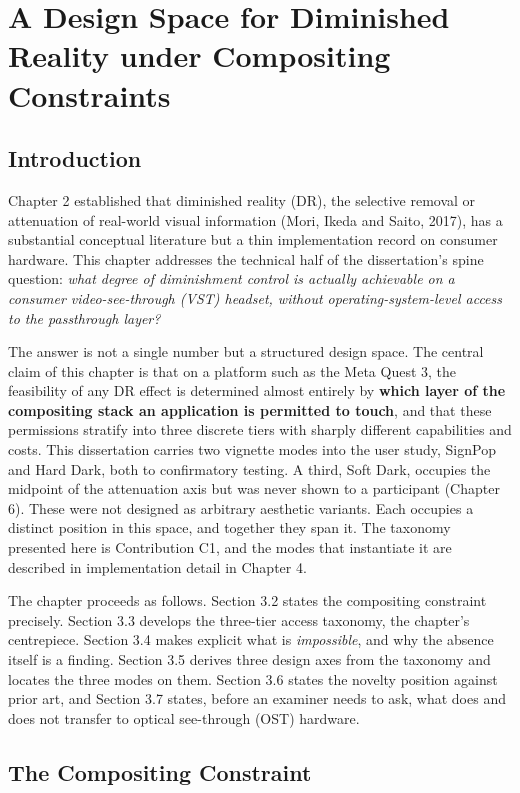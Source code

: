 \chapter{A Design Space for Diminished Reality under Compositing Constraints}

\section{Introduction}

Chapter 2 established that diminished reality (DR), the selective removal or attenuation of
real-world visual information (Mori, Ikeda and Saito, 2017), has a substantial conceptual literature
but a thin implementation record on consumer hardware. This chapter addresses the technical half of the dissertation's spine
question: \textit{what degree of diminishment control is actually achievable on a consumer video-see-through
(VST) headset, without operating-system-level access to the passthrough layer?}

The answer is not a single number but a structured design space. The central claim of this chapter is
that on a platform such as the Meta Quest 3, the feasibility of any DR effect is determined almost
entirely by \textbf{which layer of the compositing stack an application is permitted to touch}, and that
these permissions stratify into three discrete tiers with sharply different capabilities and costs.
This dissertation carries two vignette modes into the user study, SignPop and Hard Dark, both to
confirmatory testing. A third, Soft Dark, occupies the midpoint of the attenuation axis but was never
shown to a participant (Chapter 6). These were not
designed as arbitrary aesthetic variants. Each occupies a distinct position in this space, and
together they span it. The taxonomy presented here is Contribution C1, and the modes that instantiate
it are described in implementation detail in Chapter 4.

The chapter proceeds as follows. Section 3.2 states the compositing constraint precisely.
Section 3.3 develops the three-tier access taxonomy, the chapter's centrepiece. Section 3.4 makes
explicit what is \textit{impossible}, and why the absence itself is a finding. Section 3.5 derives three
design axes from the taxonomy and locates the three modes on them. Section 3.6 states the novelty
position against prior art, and Section 3.7 states, before an examiner needs to ask, what does and
does not transfer to optical see-through (OST) hardware.

\section{The Compositing Constraint}

